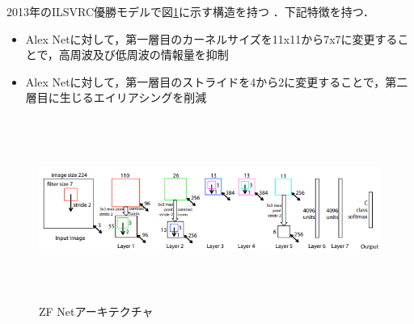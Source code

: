 2013年のILSVRC優勝モデルで図\ref{arch_zfnet}に示す構造を持つ \cite{arxiv_zfnet}．下記特徴を持つ．

\begin{itemize}
	\item Alex Netに対して，第一層目のカーネルサイズを11x11から7x7に変更することで，高周波及び低周波の情報量を抑制
	\item Alex Netに対して，第一層目のストライドを4から2に変更することで，第二層目に生じるエイリアシングを削減
\end{itemize}

\begin{figure} [H]
	\begin{center}
		\includegraphics[clip, height=6cm, bb=-20 0 675 219]{data/figure/arch_zfnet.png}
		\caption{ZF Netアーキテクチャ}
		\label{arch_zfnet}
	\end{center}
\end{figure}
